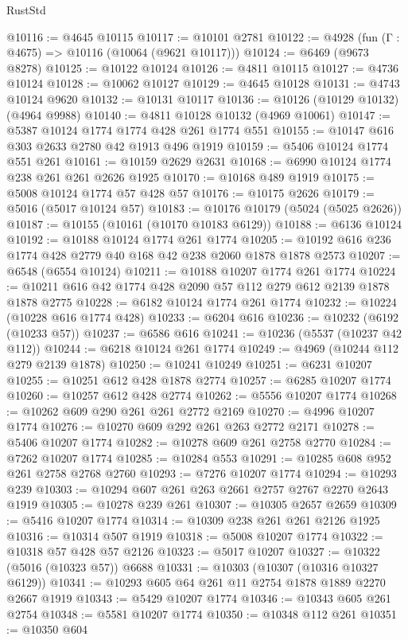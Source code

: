\begin{lexlean}{RustStd}
\begin{coremodule}
@10116 := @4645 @10115
@10117 := @10101 @2781
@10122 := @4928 (fun (Γ : @4675) => @10116 (@10064 (@9621 @10117)))
@10124 := @6469 (@9673 @8278)
@10125 := @10122 @10124
@10126 := @4811 @10115
@10127 := @4736 @10124
@10128 := @10062 @10127
@10129 := @4645 @10128
@10131 := @4743 @10124 @9620
@10132 := @10131 @10117
@10136 := @10126 (@10129 @10132) (@4964 @9988)
@10140 := @4811 @10128 @10132 (@4969 @10061)
@10147 := @5387 @10124 @1774 @1774 @428 @261 @1774 @551
@10155 := @10147 @616 @303 @2633 @2780 @42 @1913 @496 @1919
@10159 := @5406 @10124 @1774 @551 @261
@10161 := @10159 @2629 @2631
@10168 := @6990 @10124 @1774 @238 @261 @261 @2626 @1925
@10170 := @10168 @489 @1919
@10175 := @5008 @10124 @1774 @57 @428 @57
@10176 := @10175 @2626
@10179 := @5016 (@5017 @10124 @57)
@10183 := @10176 @10179 (@5024 (@5025 @2626))
@10187 := @10155 (@10161 (@10170 @10183 @6129))
@10188 := @6136 @10124
@10192 := @10188 @10124 @1774 @261 @1774
@10205 := @10192 @616 @236 @1774 @428 @2779 @40 @168 @42 @238 @2060 @1878 @1878 @2573
@10207 := @6548 (@6554 @10124)
@10211 := @10188 @10207 @1774 @261 @1774
@10224 := @10211 @616 @42 @1774 @428 @2090 @57 @112 @279 @612 @2139 @1878 @1878 @2775
@10228 := @6182 @10124 @1774 @261 @1774
@10232 := @10224 (@10228 @616 @1774 @428)
@10233 := @6204 @616
@10236 := @10232 (@6192 (@10233 @57))
@10237 := @6586 @616
@10241 := @10236 (@5537 (@10237 @42 @112))
@10244 := @6218 @10124 @261 @1774
@10249 := @4969 (@10244 @112 @279 @2139 @1878)
@10250 := @10241 @10249
@10251 := @6231 @10207
@10255 := @10251 @612 @428 @1878 @2774
@10257 := @6285 @10207 @1774
@10260 := @10257 @612 @428 @2774
@10262 := @5556 @10207 @1774
@10268 := @10262 @609 @290 @261 @261 @2772 @2169
@10270 := @4996 @10207 @1774
@10276 := @10270 @609 @292 @261 @263 @2772 @2171
@10278 := @5406 @10207 @1774
@10282 := @10278 @609 @261 @2758 @2770
@10284 := @7262 @10207 @1774
@10285 := @10284 @553
@10291 := @10285 @608 @952 @261 @2758 @2768 @2760
@10293 := @7276 @10207 @1774
@10294 := @10293 @239
@10303 := @10294 @607 @261 @263 @2661 @2757 @2767 @2270 @2643 @1919
@10305 := @10278 @239 @261
@10307 := @10305 @2657 @2659
@10309 := @5416 @10207 @1774
@10314 := @10309 @238 @261 @261 @2126 @1925
@10316 := @10314 @507 @1919
@10318 := @5008 @10207 @1774
@10322 := @10318 @57 @428 @57 @2126
@10323 := @5017 @10207
@10327 := @10322 (@5016 (@10323 @57)) @6688
@10331 := @10303 (@10307 (@10316 @10327 @6129))
@10341 := @10293 @605 @64 @261 @11 @2754 @1878 @1889 @2270 @2667 @1919
@10343 := @5429 @10207 @1774
@10346 := @10343 @605 @261 @2754
@10348 := @5581 @10207 @1774
@10350 := @10348 @112 @261
@10351 := @10350 @604

\end{coremodule}
\end{lexlean}
